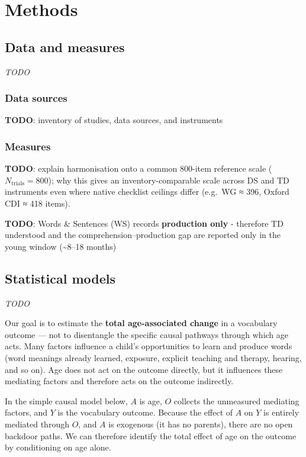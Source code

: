 \documentclass[
  11pt,
  a4paper,
]{report}
\begin{document}
\part{Methods}

\chapter{Data and measures}\label{data-and-measures}

\emph{TODO}

\hfill\break

\section{Data sources}\label{sec-data}

\textbf{TODO}: inventory of studies, data sources, and instruments

\section{Measures}\label{measures}

\textbf{TODO}: explain harmonisation onto a common 800-item reference
scale (\(N_{\text{trials}} = 800\)); why this gives an
inventory-comparable scale across DS and TD instruments even where
native checklist ceilings differ (e.g.~WG ≈ 396, Oxford CDI ≈ 418
items).

\textbf{TODO}: Words \& Sentences (WS) records \textbf{production only}
- therefore TD understood and the comprehension--production gap are
reported only in the young window (\textasciitilde8--18 months)

\chapter{Statistical models}\label{statistical-models-1}

\emph{TODO}

\hfill\break

Our goal is to estimate the \textbf{total age-associated change} in a
vocabulary outcome --- not to disentangle the specific causal pathways
through which age acts. Many factors influence a child's opportunities
to learn and produce words (word meanings already learned, exposure,
explicit teaching and therapy, hearing, and so on). Age does not act on
the outcome directly, but it influences these mediating factors and
therefore acts on the outcome indirectly.

In the simple causal model below, \(A\) is age, \(O\) collects the
unmeasured mediating factors, and \(Y\) is the vocabulary outcome.
Because the effect of \(A\) on \(Y\) is entirely mediated through \(O\),
and \(A\) is exogenous (it has no parents), there are no open backdoor
paths. We can therefore identify the total effect of age on the outcome
by conditioning on age alone.
\end{document}
